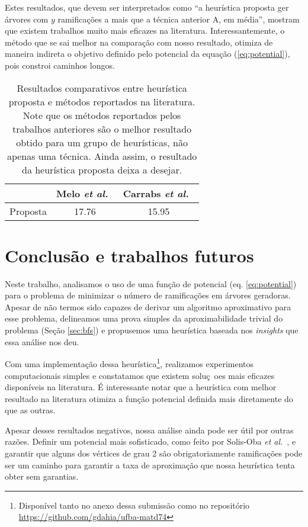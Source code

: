 \documentclass[conference]{IEEEtran}
\begin{document}
Estes resultados, que devem ser interpretados como ``a heur\'istica proposta ger
\'arvores com $y$ ramifica\c{c}\~oes a mais que a t\'ecnica anterior A, em m\'edia'',
mostram que existem trabalhos muito mais eficazes na literatura. Interessantemente, o m\'etodo
que se sai melhor na compara\c{c}\~ao com nosso resultado, otimiza de maneira indireta o objetivo
definido pelo potencial da equa\c{c}\~ao (\ref{eq:potential}), pois constroi caminhos longos.

\begin{table}
  \centering
  \caption{Resultados comparativos entre heur\'istica proposta e m\'etodos reportados na literatura.
  Note que os m\'etodos reportados pelos trabalhos anteriores s\~ao o melhor resultado obtido para
  um grupo de heur\'isticas, n\~ao apenas uma t\'ecnica. Ainda assim, o resultado da heur\'istica
  proposta deixa a desejar.}
  \begin{tabular}{|c|c|c|}
    \hline
             & Melo \textit{et al.}~\cite{melo2016} & Carrabs \textit{et al.}~\cite{carrabs2013} \\
    \hline
    Proposta & 17.76 & 15.95 \\
    \hline
  \end{tabular}
  \label{table:results}
\end{table}

\section{Conclus\~ao e trabalhos futuros}
Neste trabalho, analisamos o uso de uma fun\c{c}\~ao de potencial (eq. \ref{eq:potential}) para o
problema de minimizar o n\'umero de ramifica\c{c}\~oes em \'arvores geradoras. Apesar de n\~ao termos
sido capazes de derivar um algoritmo aproximativo para esse problema, delineamos uma prova simples
da aproximabilidade trivial do problema (Se\c{c}\~ao \ref{sec:bfs}) e propusemos uma heur\'istica
baseada nos \textit{insights} que essa an\'alise nos deu.

Com uma implementa\c{c}\~ao dessa heur\'istica\footnote{Dispon\'ivel tanto no anexo dessa
submiss\~ao como no reposit\'orio \url{https://github.com/gdahia/ufba-matd74}}, realizamos
experimentos computacionais simples e constatamos que existem solu\c{c}~oes mais eficazes
dispon\'iveis na literatura. \'E interessante notar que a heur\'istica com melhor resultado na
literatura otimiza a fun\c{c}\~ao potencial definida mais diretamente do que as outras.

Apesar desses resultados negativos, nossa an\'alise ainda pode ser \'util por outras raz\~oes.
Definir um potencial mais sofisticado, como feito por Solis-Oba \textit{et al.}~\cite{solis-oba2017}, e garantir que alguns dos v\'ertices de grau 2 s\~ao obrigatoriamente ramifica\c{c}\~oes pode ser um caminho para garantir a taxa de aproxima\c{c}\~ao que nossa heur\'istica tenta obter sem garantias.
\end{document}
